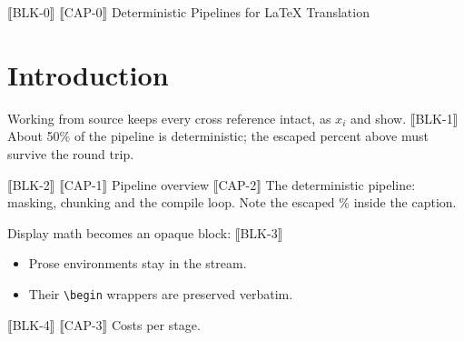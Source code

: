 ⟦BLK-0⟧
⟦CAP-0⟧ Deterministic Pipelines for \LaTeX{} Translation
\maketitle

\section{Introduction}
\label{sec:intro}
Working from source keeps every cross reference intact, as $x_i$ and
\cite{knuth1984} show.  ⟦BLK-1⟧
About 50\% of the pipeline is deterministic; the escaped percent above must
survive the round trip.

⟦BLK-2⟧
⟦CAP-1⟧ Pipeline overview
⟦CAP-2⟧ The deterministic pipeline: masking, chunking and the compile loop. Note the escaped \% inside the caption.

Display math becomes an opaque block:
⟦BLK-3⟧

\begin{itemize}
  \item Prose environments stay in the stream.
  \item Their \texttt{\textbackslash begin} wrappers are preserved verbatim.
\end{itemize}

⟦BLK-4⟧
⟦CAP-3⟧ Costs per stage.



